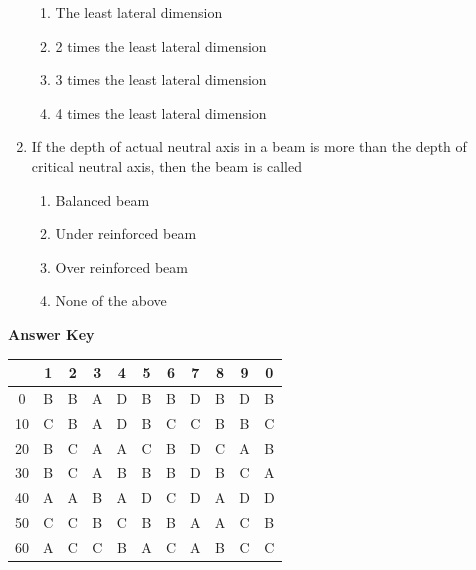 \documentclass[11pt,a4paper]{article}
\begin{document}
\begin{enumerate}
\begin{enumerate}[label=\Alph*.]
\item{The least lateral dimension}
\item{2 times the least lateral dimension}
\item{3 times the least lateral dimension}
\item{4 times the least lateral dimension}
\end{enumerate}
\item{If the depth of actual neutral axis in a beam is more than the depth of critical neutral axis, then the beam is called}
\begin{enumerate}[label=\Alph*.]
\item{Balanced beam}
\item{Under reinforced beam}
\item{Over reinforced beam}
\item{None of the above}
\end{enumerate}
\end{enumerate}
\textbf{Answer Key}
\begin{tabular}{ | c | c c c c c c c c c c | }
\hline
 & 1 & 2 & 3 & 4 & 5 & 6 & 7 & 8 & 9 & 0 \\
\hline
0 & B & B & A & D & B & B & D & B & D & B \\
10 & C & B & A & D & B & C & C & B & B & C \\
20 & B & C & A & A & C & B & D & C & A & B \\
30 & B & C & A & B & B & B & D & B & C & A \\
40 & A & A & B & A & D & C & D & A & D & D \\
50 & C & C & B & C & B & B & A & A & C & B \\
60 & A & C & C & B & A & C & A & B & C & C \\
\hline
\end{tabular}
\clearpage
\end{document}
